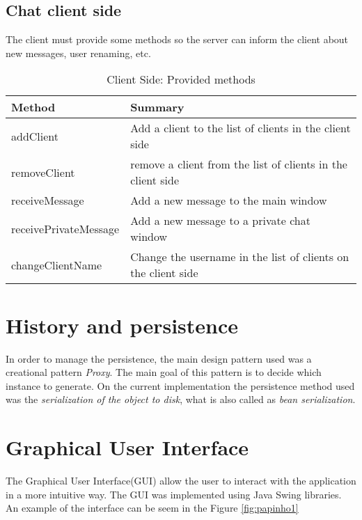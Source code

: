 \documentclass[times, 10pt,twocolumn]{article}
\begin{document}
\subsection{Chat client side}

The client must provide some methods so the server can inform the client about new messages, user renaming, etc.  
  \begin{table}[H]
  \begin{center}
      \begin{tabular}{ | l | p{5cm} |}
      \hline
      Method & Summary \\ \hline
      addClient & Add a client to the list of clients in the client side \\ \hline 
      removeClient & remove a client from the list of clients in the client side \\ \hline
      receiveMessage & Add a new message to the main window \\ \hline
      receivePrivateMessage &  Add a new message to a private chat window \\ \hline
      changeClientName & Change the username in the list of clients on the client side \\ \hline
      \end{tabular}
  \end{center}
  \caption{Client Side: Provided methods}
  \label{tab:clientprovide}
  \end{table}

\section{History and persistence}

In order to manage the persistence, the main design pattern used was a creational pattern {\it Proxy}. The main goal of this pattern is to decide which instance to generate.
On the current implementation the persistence method used was the {\it serialization of the object to disk}, what is also called as {\it bean serialization}. 

\section{Graphical User Interface}

The Graphical User Interface(GUI) allow the user to interact with the application in a more intuitive way. 
The GUI was implemented using Java Swing libraries. An example of the interface can be seem in the Figure \ref{fig:papinho1}
\end{document}

